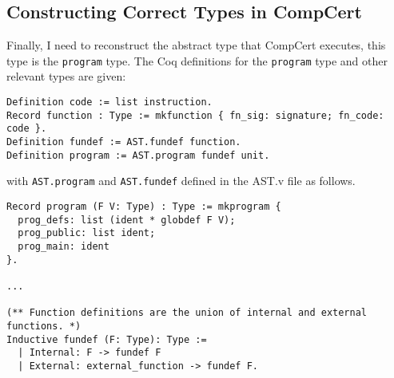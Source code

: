 \subsection{Constructing Correct Types in CompCert}\label{constructing-types}

Finally, I need to reconstruct the abstract type that CompCert executes, this type is the \texttt{program} type. The Coq definitions for the \texttt{program} type and other relevant types are given:

\begin{lstlisting}[language=Coq, caption =Asm.v program definition]
Definition code := list instruction.
Record function : Type := mkfunction { fn_sig: signature; fn_code: code }.
Definition fundef := AST.fundef function.
Definition program := AST.program fundef unit.
\end{lstlisting}

with \texttt{AST.program} and \texttt{AST.fundef} defined in the AST.v file as follows.



\begin{lstlisting}[language=Coq, caption = AST.v program record definition and fundef definition]
Record program (F V: Type) : Type := mkprogram {
  prog_defs: list (ident * globdef F V);
  prog_public: list ident;
  prog_main: ident
}.

...

(** Function definitions are the union of internal and external functions. *)
Inductive fundef (F: Type): Type :=
  | Internal: F -> fundef F
  | External: external_function -> fundef F.
\end{lstlisting}

